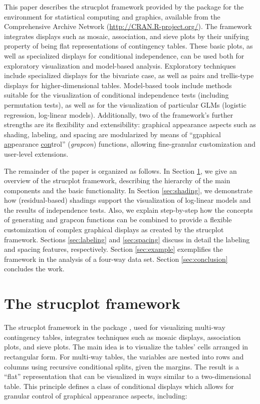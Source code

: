 \documentclass{Z}
\begin{document}
This paper describes the strucplot framework provided by the 
package for the  environment for statistical computing and
graphics, available from the Comprehensive  Archive Network
(\url{http://CRAN.R-project.org/}).  The framework integrates displays
such as mosaic, association, and sieve plots by their unifying property
of being flat representations of contingency tables.  These basic plots,
as well as specialized displays for conditional independence, can be
used both for exploratory visualization and model-based analysis.
Exploratory techniques include specialized displays for the bivariate
case, as well as pairs and trellis-type displays for
higher-dimensional tables. Model-based tools include methods suitable
for the visualization of conditional independence tests (including
permutation tests), as well as for the visualization of particular GLMs
(logistic regression, log-linear models). Additionally, two of the
framework's further strengths are its flexibility and extensibility:
graphical appearance aspects such as shading, labeling, and spacing are
modularized by means of ``\underline{\vphantom{g}gr}aphical 
\underline{\vphantom{g}ap}pearance \underline{\vphantom{g}con}trol''
(\emph{grapcon}) functions, allowing
fine-granular customization and user-level extensions.

The remainder of the paper is organized as follows. In
Section \ref{sec:strucplot}, we give an overview of the strucplot
framework, describing the hierarchy of the main components and the
basic functionality. 
In Section \ref{sec:shading}, we demonstrate how
(residual-based) shadings support the visualization of log-linear models and
the results of independence tests. Also, we explain step-by-step how
the concepts of generating and grapcon functions
can be combined to provide a flexible customization of
complex graphical displays as created by the strucplot framework.
Sections \ref{sec:labeling} and \ref{sec:spacing} discuss in detail the labeling
and spacing features, respectively. Section \ref{sec:example}
exemplifies the framework in the analysis of a four-way data set.
Section \ref{sec:conclusion} concludes the work.

\section[The strucplot framework]{The strucplot framework}
\label{sec:strucplot}

The strucplot framework in the  package , used for visualizing
multi-way contingency tables, integrates techniques such as
mosaic displays, association plots, and sieve plots. The main idea is to visualize
the tables' cells arranged in rectangular form. For multi-way tables,
the variables are nested into rows and columns using recursive
conditional splits, given the margins. The result is a 
``flat'' representation that can be visualized in
ways similar to a two-dimensional table.
This principle defines a class of conditional displays which allows
for granular control of graphical appearance aspects, including:
\end{document}
